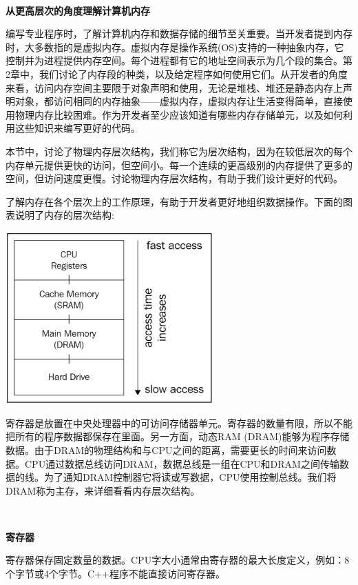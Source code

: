\noindent\textbf{}\ \par
\textbf{从更高层次的角度理解计算机内存} \ \par

编写专业程序时，了解计算机内存和数据存储的细节至关重要。当开发者提到内存时，大多数指的是虚拟内存。虚拟内存是操作系统(OS)支持的一种抽象内存，它控制并为进程提供内存空间。每个进程都有它的地址空间表示为几个段的集合。第2章中，我们讨论了内存段的种类，以及给定程序如何使用它们。从开发者的角度来看，访问内存空间主要限于对象声明和使用，无论是堆栈、堆还是静态内存上声明对象，都访问相同的内存抽象——虚拟内存，虚拟内存让生活变得简单，直接使用物理内存比较困难。作为开发者至少应该知道有哪些内存存储单元，以及如何利用这些知识来编写更好的代码。 \par
本节中，讨论了物理内存层次结构，我们称它为层次结构，因为在较低层次的每个内存单元提供更快的访问，但空间小。每一个连续的更高级别的内存提供了更多的空间，但访问速度更慢。讨论物理内存层次结构，有助于我们设计更好的代码。 \par
了解内存在各个层次上的工作原理，有助于开发者更好地组织数据操作。下面的图表说明了内存的层次结构: \par

\begin{center}
	\includegraphics[width=0.6\textwidth]{content/Section-1/Chapter-5/5}
\end{center}

寄存器是放置在中央处理器中的可访问存储器单元。寄存器的数量有限，所以不能把所有的程序数据都保存在里面。另一方面，动态RAM (DRAM)能够为程序存储数据。由于DRAM的物理结构和与CPU之间的距离，需要更长的时间来访问数据。CPU通过数据总线访问DRAM，数据总线是一组在CPU和DRAM之间传输数据的线。为了通知DRAM控制器它将读或写数据，CPU使用控制总线。我们将DRAM称为主存，来详细看看内存层次结构。 \par

\noindent\textbf{}\ \par
\textbf{寄存器} \ \par
寄存器保存固定数量的数据。CPU字大小通常由寄存器的最大长度定义，例如：8个字节或4个字节。C++程序不能直接访问寄存器。 \par

